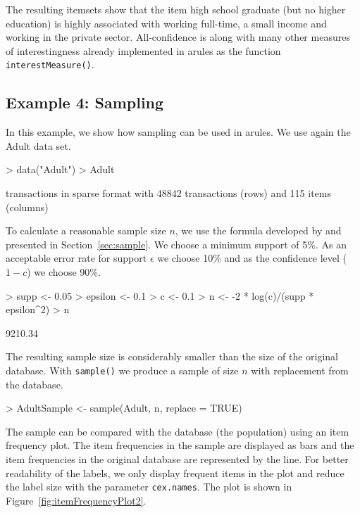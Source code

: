 \documentclass[10pt,a4paper]{article}
\newcommand{\strong}[1]{{\normalfont\fontseries{b}\selectfont #1}}
\newcommand{\func}[1]{\mbox{\texttt{#1()}}}
\newcommand{\code}[1]{\mbox{\texttt{#1}}}
\newcommand{\pkg}[1]{\strong{#1}}
\begin{document}
The resulting itemsets show that the item high school graduate (but no
higher education) is highly associated with working full-time, a small
income and working in the private sector.  All-confidence is 
along with many other measures of interestingness already
implemented in \pkg{arules} as the function \func{interestMeasure}.

\subsection{Example 4: Sampling}
In this example, we show how sampling
can be used in \pkg{arules}. We use again the Adult data set.

\begin{Schunk}
\begin{Sinput}
> data("Adult")
> Adult
\end{Sinput}
\begin{Soutput}
transactions in sparse format with
 48842 transactions (rows) and
 115 items (columns)
\end{Soutput}
\end{Schunk}

To calculate a reasonable sample size $n$, we use the formula developed
by \cite{arules:Zaki+Parthasarathy+Li+Ogihara:1997} and presented in 
Section~\ref{sec:sample}. We choose a minimum support of 5\%.
As an acceptable error rate for support $\epsilon$ we choose 10\% and
as the confidence level ($1-c$) we choose 90\%. 

\begin{Schunk}
\begin{Sinput}
> supp <- 0.05
> epsilon <- 0.1
> c <- 0.1
> n <- -2 * log(c)/(supp * epsilon^2)
> n
\end{Sinput}
\begin{Soutput}
[1] 9210.34
\end{Soutput}
\end{Schunk}

The resulting sample size is considerably smaller than the size of the
original database.
With \func{sample} we produce a sample of size $n$ with replacement from
the database.


\begin{Schunk}
\begin{Sinput}
> AdultSample <- sample(Adult, n, replace = TRUE)
\end{Sinput}
\end{Schunk}

The sample can be compared with the 
database (the population) using an item frequency plot.
The item frequencies in the sample are displayed as bars and the
item frequencies in the original database are represented by 
the line. For better readability of the labels, we
only display frequent items in the plot and reduce
the label size with the parameter \code{cex.names}.
The plot is shown in Figure~\ref{fig:itemFrequencyPlot2}.
\end{document}
